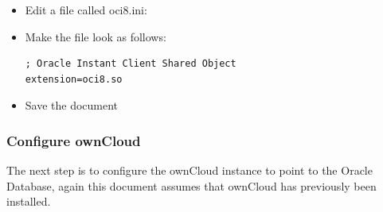 \documentclass[letterpaper,10pt,english]{sphinxmanual}
\begin{document}
\begin{itemize}
\begin{description}
\begin{itemize}
\item {} 
Edit a file called oci8.ini: 

\item {} 
Make the file look as follows:

\begin{Verbatim}[commandchars=\\\{\}]
; Oracle Instant Client Shared Object
extension=oci8.so
\end{Verbatim}

\item {} 
Save the document

\end{itemize}

\end{description}

\end{itemize}


\subsubsection{Configure ownCloud}
\label{enterprise_installation/oracle_db_configuration:configure-owncloud}
The next step is to configure the ownCloud instance to point to the Oracle Database, again this document assumes
that ownCloud has previously been installed.
\end{document}
